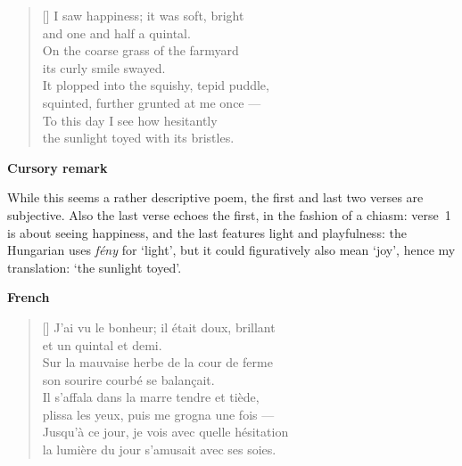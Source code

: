 \documentclass[a4paper,12pt,twoside,final]{book}
\begin{document}
\newpage



\settowidth{\versewidth}{It plopped into the squishy, tepid puddle,}

\begin{verse}[\versewidth]
  I saw happiness; it was soft, bright \\
  and one and half a quintal. \\
  On the coarse grass of the farmyard \\
  its curly smile swayed. \\
  It plopped into the squishy, tepid puddle, \\
  squinted, further grunted at me once --- \\
  To this day I see how hesitantly \\
  the sunlight toyed with its bristles. \\
\end{verse}

\bigskip

\noindent \textbf{Cursory remark}

\medskip

While this seems a rather descriptive poem, the first and last two
verses are subjective. Also the last verse echoes the first, in the
fashion of a chiasm: verse~1 is about seeing happiness, and the last
features light and playfulness: the Hungarian uses \emph{fény} for
`light', but it could figuratively also mean `joy', hence my
translation: `the sunlight toyed'.

\bigskip

\noindent \textbf{French}


\settowidth{\versewidth}{Il s'affala dans la marre tende et tiède,}

\begin{verse}[\versewidth]
  J'ai vu le bonheur; il était doux, brillant \\
  et un quintal et demi. \\
  Sur la mauvaise herbe de la cour de ferme \\
  son sourire courbé se balançait. \\
  Il s'affala dans la marre tendre et tiède, \\
  plissa les yeux, puis me grogna une fois --- \\
  Jusqu'à ce jour, je vois avec quelle hésitation \\
  la lumière du jour s'amusait avec ses soies. \\
\end{verse}
\end{document}
